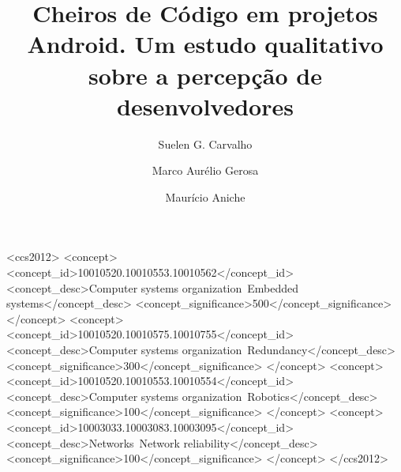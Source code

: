 \documentclass[sigconf]{acmart}
\begin{document}
\title{Cheiros de C\'odigo em projetos Android. Um estudo qualitativo sobre a percep\c{c}\~ao de desenvolvedores}


\author{Suelen G. Carvalho}

\author{Marco Aur\'elio Gerosa}

\author{Maur\'icio Aniche}

\renewcommand{\shortauthors}{B. Trovato et al.}


\begin{abstract}

\end{abstract}

%
%
\begin{CCSXML}
<ccs2012>
 <concept>
  <concept_id>10010520.10010553.10010562</concept_id>
  <concept_desc>Computer systems organization~Embedded systems</concept_desc>
  <concept_significance>500</concept_significance>
 </concept>
 <concept>
  <concept_id>10010520.10010575.10010755</concept_id>
  <concept_desc>Computer systems organization~Redundancy</concept_desc>
  <concept_significance>300</concept_significance>
 </concept>
 <concept>
  <concept_id>10010520.10010553.10010554</concept_id>
  <concept_desc>Computer systems organization~Robotics</concept_desc>
  <concept_significance>100</concept_significance>
 </concept>
 <concept>
  <concept_id>10003033.10003083.10003095</concept_id>
  <concept_desc>Networks~Network reliability</concept_desc>
  <concept_significance>100</concept_significance>
 </concept>
</ccs2012>  
\end{CCSXML}
\end{document}
